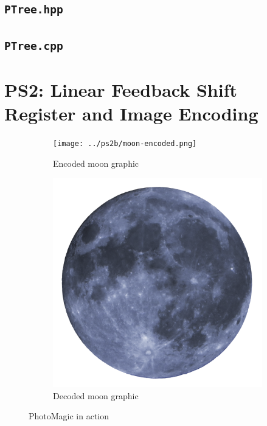 \documentclass[12pt]{article}
\begin{document}


\subsection{\texttt{PTree.hpp}}



\subsection{\texttt{PTree.cpp}}



\newpage

\section{PS2: Linear Feedback Shift Register and Image Encoding}

\begin{figure}
\centering
\begin{subfigure}{.5\textwidth}
  \centering
  \texttt{[image: ../ps2b/moon-encoded.png]}
  \caption{Encoded moon graphic}
  \label{fig:moon-encoded}
\end{subfigure}%
\begin{subfigure}{.5\textwidth}
  \centering
  \includegraphics[width=1\linewidth]{../ps2b/moon-decoded.png}
  \caption{Decoded moon graphic}
  \label{fig:moon-decoded}
\end{subfigure}
\caption{PhotoMagic in action}
\label{fig:test}
\end{figure}
\end{document}
